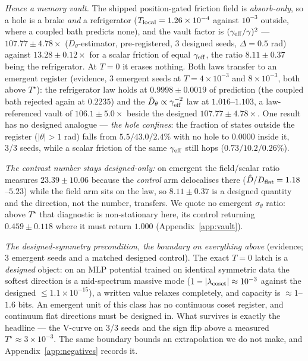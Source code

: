 \emph{Hence a memory vault.} The shipped position-gated friction field is \emph{absorb-only}, so a hole is a brake \emph{and} a refrigerator ($T_{\rm local}=1.26\times10^{-4}$ against $10^{-3}$ outside, where a coupled bath predicts none), and the vault factor is $(\gamma_{\rm eff}/\gamma)^2$ --- $107.77\pm4.78\times$ ($D_\theta$-estimator, pre-registered, 3 designed seeds, $\Delta=0.5$ rad) against $13.28\pm0.12\times$ for a scalar friction of equal $\gamma_{\rm eff}$, the ratio $8.11\pm0.37$ being the refrigerator. At $T=0$ it erases nothing. Both laws transfer to an emergent register (evidence, 3 emergent seeds at $T=4\times10^{-3}$ and $8\times10^{-3}$, both above $T^\star$): the refrigerator law holds at $0.9998\pm0.0019$ of prediction (the coupled bath rejected again at $0.2235$) and the $\hat D_\theta\propto\gamma_{\rm eff}^{-2}$ law at $1.016$--$1.103$, a law-referenced vault of $106.1\pm5.0\times$ beside the designed $107.77\pm4.78\times$. One result has no designed analogue --- \emph{the hole confines}: the fraction of states outside the register ($|\theta|>1$ rad) falls from $5.5/43.0/2.4\%$ with no hole to $0.0000$ inside it, 3/3 seeds, while a scalar friction of the same $\gamma_{\rm eff}$ still hops ($0.73/10.2/0.26\%$). {\footnotesize\emph{The contrast number stays designed-only:} on emergent the field/scalar ratio measures $23.39\pm10.06$ because the \emph{control} arm delocalises there ($\hat D/D_{\rm flat}=1.18$--$5.23$) while the field arm sits on the law, so $8.11\pm0.37$ is a designed quantity and the direction, not the number, transfers. We quote no emergent $\sigma_\theta$ ratio: above $T^\star$ that diagnostic is non-stationary here, its control returning $0.459\pm0.118$ where it must return $1.000$ (Appendix~\ref{app:vault}).\par} \emph{The designed-symmetry precondition, the boundary on everything above} (evidence; 3 emergent seeds and a matched designed control). The exact $T=0$ latch is a \emph{designed} object: on an MLP potential trained on identical symmetric data the softest direction is a mid-spectrum massive mode ($1-|\lambda_{\rm coset}|\approx10^{-3}$ against the designed $\le1.1\times10^{-15}$), a written value relaxes completely, and capacity is $\approx1$--$1.6$ bits. An emergent unit of this class has no continuous coset register, and continuum flat directions must be designed in. What survives is exactly the headline --- the V-curve on 3/3 seeds and the sign flip above a measured $T^\star\approx3\times10^{-3}$. The same boundary bounds an extrapolation we do not make, and Appendix~\ref{app:negatives} records it.

